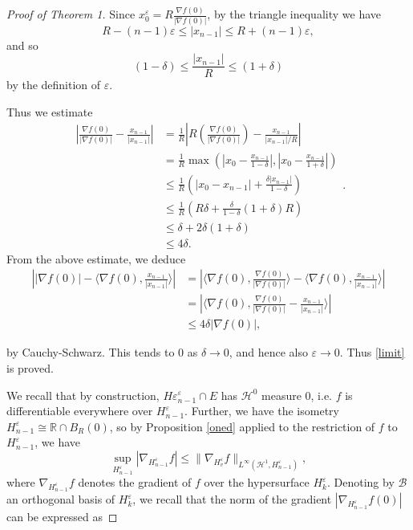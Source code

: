 \documentclass{article}
\begin{document}
\begin{proof}[Proof of Theorem 1]
\noindent Since $x^\varepsilon_0 = R\frac{\nabla f(0)}{|\nabla f(0)|}$, by the triangle inequality we have
$$R - (n-1)\varepsilon \leq |x_{n-1}| \leq R + (n-1)\varepsilon,$$
and so
$$(1-\delta)\leq \frac{|x_{n-1}|}{R} \leq (1+\delta)$$
by the definition of $\varepsilon$.

\noindent Thus we estimate
$$\begin{aligned}\left |\frac{\nabla f(0)}{|\nabla f(0)|} - \frac{x_{n-1}}{|x_{n-1}|} \right| & = \frac{1}{R}\left |R\left (\frac{\nabla f(0)}{|\nabla f(0)|} \right )- \frac{x_{n-1}}{|x_{n-1}|/R} \right |\\
&= \frac{1}{R} \max \left (|x_0 - \frac{x_{n-1}}{1-\delta}|, |x_0 -\frac{x_{n-1}}{1+\delta}| \right )\\
&\leq\frac{1}{R}\left ( |x_0 - x_{n-1}| + \frac{\delta|x_{n-1}|}{1-\delta}\right )\\
&\leq \frac{1}{R}\left (R\delta + \frac{\delta}{1-\delta}(1+\delta) R \right ) \\
&\leq \delta + 2\delta(1+\delta)\\
&\leq 4\delta.\end{aligned}.$$
From the above estimate, we deduce
$$\begin{aligned}\left ||\nabla f(0)| - \langle\nabla f(0), \frac{x_{n-1}}{|x_{n-1}|} \rangle \right | 
&= \left |\langle \nabla f(0), \frac{\nabla f(0)}{|\nabla f(0)|} \rangle -\langle \nabla f(0), \frac{x_{n-1}}{|x_{n-1}|} \rangle \right |\\
&=\left |\langle \nabla f(0), \frac{\nabla f(0)}{|\nabla f(0)|}- \frac{x_{n-1}}{|x_{n-1}|} \rangle \right |\\
&\leq 4\delta|\nabla f(0)|, \end{aligned}$$

\noindent by Cauchy-Schwarz. This tends to $0$ as $\delta \to 0$, and hence also $\varepsilon \to 0$. Thus \ref{limit} is proved.

\noindent We recall that by construction, $H\varepsilon_{n-1}^\varepsilon \cap E$ has $\mathcal H^0$ measure $0$, i.e. $f$ is differentiable everywhere over $H_{n-1}^\varepsilon$. Further, we have the isometry $ H^\varepsilon_{n-1} \cong \mathbb R \cap B_R (0)$, so by Proposition \ref{oned} applied to the restriction of $f$ to $H^\varepsilon_{n-1}$, we have
\begin{equation}\label{argh}\sup_{H^\varepsilon_{n-1}} |\nabla_{H^\varepsilon_{n-1}} f| \leq \|\nabla_{H^\varepsilon_v} f\|_{L^\infty(\mathcal H^{1}, H^\varepsilon_{n-1})},\end{equation} 
where $\nabla_{H_{n-1}^\varepsilon} f$ denotes the gradient of $f$ over the hypersurface $H_k^{\varepsilon}$. Denoting by $\mathcal B$ an orthogonal basis of $H^{\varepsilon}_k$, we recall that the norm of the gradient $|\nabla_{H^\varepsilon_{n-1}}f(0)|$ can be expressed as


\end{proof}
\end{document}
